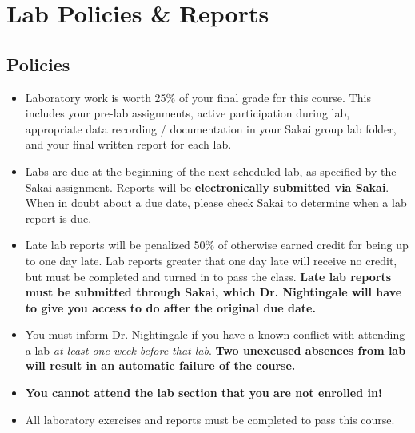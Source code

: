 \section{Lab Policies \& Reports}
\subsection{Policies}
\begin{itemize}
    \item Laboratory work is worth 25\% of your final grade for this course.
        This includes your pre-lab assignments, active participation during
        lab, appropriate data recording / documentation in your Sakai group lab
        folder, and your final written report for each lab.

    \item Labs are due at the beginning of the next scheduled lab, as specified
        by the Sakai assignment. Reports will be \textbf{electronically
            submitted via Sakai}.  When in doubt about a due date, please check Sakai to determine when a lab
        report is due.

    \item Late lab reports will be penalized 50\% of otherwise earned credit
        for being up to one day late.  Lab reports greater that one day late
        will receive no credit, but must be completed and turned in to pass the
        class.  {\bf Late lab reports must be submitted through Sakai, which
            Dr. Nightingale will have to give you access to do after the original
            due date.}

    \item You must inform Dr. Nightingale if you have a known conflict with
        attending a lab \emph{at least one week before that lab}.  \textbf{Two
            unexcused absences from lab will result in an automatic failure of
            the course.}

    \item \textbf{You cannot attend the lab section that you are not enrolled in!}

    \item All laboratory exercises and reports must be completed to pass this
        course.
\end{itemize}

